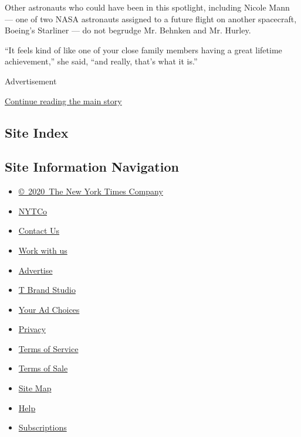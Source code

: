 Other astronauts who could have been in this spotlight, including Nicole
Mann --- one of two NASA astronauts assigned to a future flight on
another spacecraft, Boeing's Starliner --- do not begrudge Mr. Behnken
and Mr. Hurley.

``It feels kind of like one of your close family members having a great
lifetime achievement,'' she said, ``and really, that's what it is.''

Advertisement

\protect\hyperlink{after-bottom}{Continue reading the main story}

\hypertarget{site-index}{%
\subsection{Site Index}\label{site-index}}

\hypertarget{site-information-navigation}{%
\subsection{Site Information
Navigation}\label{site-information-navigation}}

\begin{itemize}
\tightlist
\item
  \href{https://help.nytimes3xbfgragh.onion/hc/en-us/articles/115014792127-Copyright-notice}{©~2020~The
  New York Times Company}
\end{itemize}

\begin{itemize}
\tightlist
\item
  \href{https://www.nytco.com/}{NYTCo}
\item
  \href{https://help.nytimes3xbfgragh.onion/hc/en-us/articles/115015385887-Contact-Us}{Contact
  Us}
\item
  \href{https://www.nytco.com/careers/}{Work with us}
\item
  \href{https://nytmediakit.com/}{Advertise}
\item
  \href{http://www.tbrandstudio.com/}{T Brand Studio}
\item
  \href{https://www.nytimes3xbfgragh.onion/privacy/cookie-policy\#how-do-i-manage-trackers}{Your
  Ad Choices}
\item
  \href{https://www.nytimes3xbfgragh.onion/privacy}{Privacy}
\item
  \href{https://help.nytimes3xbfgragh.onion/hc/en-us/articles/115014893428-Terms-of-service}{Terms
  of Service}
\item
  \href{https://help.nytimes3xbfgragh.onion/hc/en-us/articles/115014893968-Terms-of-sale}{Terms
  of Sale}
\item
  \href{https://spiderbites.nytimes3xbfgragh.onion}{Site Map}
\item
  \href{https://help.nytimes3xbfgragh.onion/hc/en-us}{Help}
\item
  \href{https://www.nytimes3xbfgragh.onion/subscription?campaignId=37WXW}{Subscriptions}
\end{itemize}
